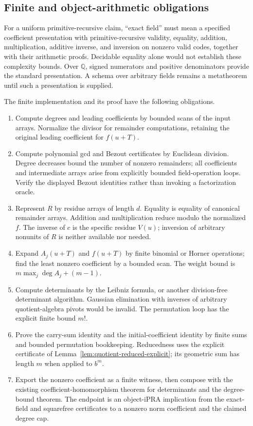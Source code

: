\subsection{Finite and object-arithmetic obligations}

For a uniform primitive-recursive claim, ``exact field'' must mean a
specified coefficient presentation with primitive-recursive validity,
equality, addition, multiplication, additive inverse, and inversion on
nonzero valid codes, together with their arithmetic proofs.  Decidable
equality alone would not establish these complexity bounds.  Over
\(\mathbb Q\), signed numerators and positive denominators provide the
standard presentation.  A schema over arbitrary fields remains a
metatheorem until such a presentation is supplied.

The finite implementation and its proof have the following obligations.
\begin{enumerate}
\item Compute degrees and leading coefficients by bounded scans of the
      input arrays.  Normalize the divisor for remainder computations,
      retaining the original leading coefficient for \(f(u+T)\).
\item Compute polynomial gcd and Bezout certificates by Euclidean
      division.  Degree decreases bound the number of nonzero remainders;
      all coefficients and intermediate arrays arise from explicitly
      bounded field-operation loops.  Verify the displayed Bezout
      identities rather than invoking a factorization oracle.
\item Represent \(R\) by residue arrays of length \(d\).  Equality is
      equality of canonical remainder arrays.  Addition and multiplication
      reduce modulo the normalized \(f\).  The inverse of \(c\) is the
      specific residue \(V(u)\); inversion of arbitrary nonunits of
      \(R\) is neither available nor needed.
\item Expand \(A_j(u+T)\) and \(f(u+T)\) by finite binomial or Horner
      operations; find the least nonzero coefficient by a bounded scan.
      The weight bound is \(m\max_j\deg A_j+(m-1)\).
\item Compute determinants by the Leibniz formula, or another
      division-free determinant algorithm.  Gaussian elimination with
      inverses of arbitrary quotient-algebra pivots would be invalid.
      The permutation loop has the explicit finite bound \(m!\).
\item Prove the carry-sum identity and the initial-coefficient identity
      by finite sums and bounded permutation bookkeeping.  Reducedness
      uses the explicit certificate of Lemma~\ref{lem:quotient-reduced-explicit};
      its geometric sum has length \(m\) when applied to \(b^m\).
\item Export the nonzero coefficient as a finite witness, then compose
      with the existing coefficient-homomorphism theorem for determinants
      and the degree-bound theorem.  The endpoint is an object-iPRA
      implication from the exact-field and squarefree certificates to
      a nonzero norm coefficient and the claimed degree cap.
\end{enumerate}
